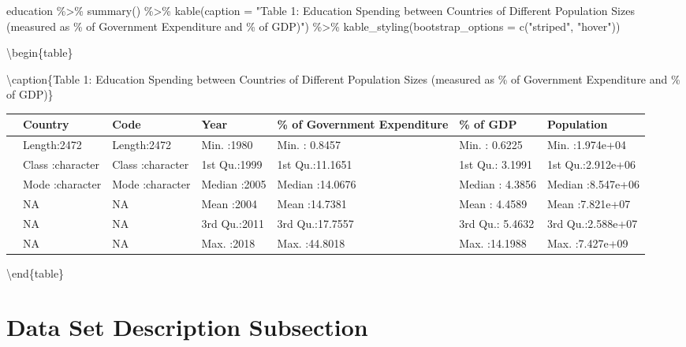 \documentclass[
]{article}
\newenvironment{Shaded}{\begin{snugshade}}{\end{snugshade}}
\newcommand{\AttributeTok}[1]{\textcolor[rgb]{0.77,0.63,0.00}{#1}}
\newcommand{\FunctionTok}[1]{\textcolor[rgb]{0.00,0.00,0.00}{#1}}
\newcommand{\NormalTok}[1]{#1}
\newcommand{\SpecialCharTok}[1]{\textcolor[rgb]{0.00,0.00,0.00}{#1}}
\newcommand{\StringTok}[1]{\textcolor[rgb]{0.31,0.60,0.02}{#1}}
\begin{document}
\begin{Shaded}
\begin{Highlighting}[]
\NormalTok{education }\SpecialCharTok{\%\textgreater{}\%}
  \FunctionTok{summary}\NormalTok{() }\SpecialCharTok{\%\textgreater{}\%}
  \FunctionTok{kable}\NormalTok{(}\AttributeTok{caption =} \StringTok{"Table 1: Education Spending between Countries of Different Population Sizes (measured as \% of Government Expenditure and \% of GDP)"}\NormalTok{) }\SpecialCharTok{\%\textgreater{}\%}
  \FunctionTok{kable\_styling}\NormalTok{(}\AttributeTok{bootstrap\_options =} \FunctionTok{c}\NormalTok{(}\StringTok{"striped"}\NormalTok{, }\StringTok{"hover"}\NormalTok{))}
\end{Highlighting}
\end{Shaded}

\textbackslash begin\{table\}

\textbackslash caption\{\label{tab:table}Table 1: Education Spending between Countries of Different Population Sizes (measured as \% of Government Expenditure and \% of GDP)\}
\centering

\begin{tabular}[t]{l|l|l|l|l|l|l}
\hline
  &   Country &     Code &      Year & \% of Government Expenditure &    \% of GDP &   Population\\
\hline
 & Length:2472 & Length:2472 & Min.   :1980 & Min.   : 0.8457 & Min.   : 0.6225 & Min.   :1.974e+04\\
\hline
 & Class :character & Class :character & 1st Qu.:1999 & 1st Qu.:11.1651 & 1st Qu.: 3.1991 & 1st Qu.:2.912e+06\\
\hline
 & Mode  :character & Mode  :character & Median :2005 & Median :14.0676 & Median : 4.3856 & Median :8.547e+06\\
\hline
 & NA & NA & Mean   :2004 & Mean   :14.7381 & Mean   : 4.4589 & Mean   :7.821e+07\\
\hline
 & NA & NA & 3rd Qu.:2011 & 3rd Qu.:17.7557 & 3rd Qu.: 5.4632 & 3rd Qu.:2.588e+07\\
\hline
 & NA & NA & Max.   :2018 & Max.   :44.8018 & Max.   :14.1988 & Max.   :7.427e+09\\
\hline
\end{tabular}

\textbackslash end\{table\}

\hypertarget{data-set-description-subsection}{%
\section{\texorpdfstring{\textbf{Data Set Description Subsection}}{Data Set Description Subsection}}\label{data-set-description-subsection}}
\end{document}
